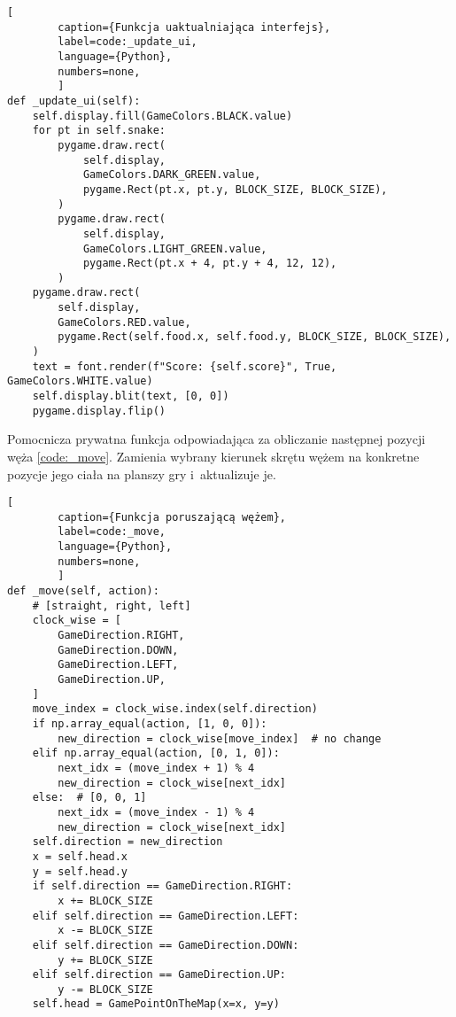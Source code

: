 \begin{onepage}
    \begin{lstlisting}[
        caption={Funkcja uaktualniająca interfejs},
        label=code:_update_ui,
        language={Python},
        numbers=none,
        ]
def _update_ui(self):
    self.display.fill(GameColors.BLACK.value)
    for pt in self.snake:
        pygame.draw.rect(
            self.display,
            GameColors.DARK_GREEN.value,
            pygame.Rect(pt.x, pt.y, BLOCK_SIZE, BLOCK_SIZE),
        )
        pygame.draw.rect(
            self.display,
            GameColors.LIGHT_GREEN.value,
            pygame.Rect(pt.x + 4, pt.y + 4, 12, 12),
        )
    pygame.draw.rect(
        self.display,
        GameColors.RED.value,
        pygame.Rect(self.food.x, self.food.y, BLOCK_SIZE, BLOCK_SIZE),
    )
    text = font.render(f"Score: {self.score}", True, GameColors.WHITE.value)
    self.display.blit(text, [0, 0])
    pygame.display.flip()
    \end{lstlisting}
\end{onepage}

\clearpage

Pomocnicza prywatna funkcja odpowiadająca za obliczanie następnej pozycji węża \ref{code:_move}. Zamienia wybrany kierunek skrętu wężem na konkretne pozycje jego ciała na planszy gry i~aktualizuje je.

\begin{onepage}
    \begin{lstlisting}[
        caption={Funkcja poruszającą wężem},
        label=code:_move,
        language={Python},
        numbers=none,
        ]
def _move(self, action):
    # [straight, right, left]
    clock_wise = [
        GameDirection.RIGHT,
        GameDirection.DOWN,
        GameDirection.LEFT,
        GameDirection.UP,
    ]
    move_index = clock_wise.index(self.direction)
    if np.array_equal(action, [1, 0, 0]):
        new_direction = clock_wise[move_index]  # no change
    elif np.array_equal(action, [0, 1, 0]):
        next_idx = (move_index + 1) % 4
        new_direction = clock_wise[next_idx]
    else:  # [0, 0, 1]
        next_idx = (move_index - 1) % 4
        new_direction = clock_wise[next_idx]
    self.direction = new_direction
    x = self.head.x
    y = self.head.y
    if self.direction == GameDirection.RIGHT:
        x += BLOCK_SIZE
    elif self.direction == GameDirection.LEFT:
        x -= BLOCK_SIZE
    elif self.direction == GameDirection.DOWN:
        y += BLOCK_SIZE
    elif self.direction == GameDirection.UP:
        y -= BLOCK_SIZE
    self.head = GamePointOnTheMap(x=x, y=y)
    \end{lstlisting}
\end{onepage}



